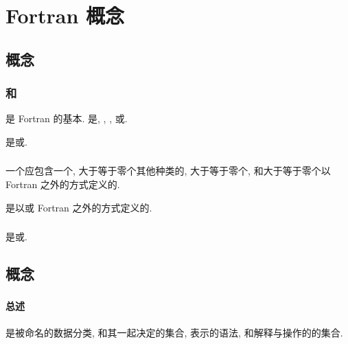 \chapter{Fortran 概念}

\section{\ProgramUnit{}概念}

\subsection{\ProgramUnit{}和\ScopingUnit{}}

\ProgramUnit{}是 Fortran \Program{}的基本\Component{}. \ProgramUnit{}是\MainProgram{}, \ExternalSubprogram{}, \Module{}, 或\Submodule{}.

\Subprogram{}是\Function{}\Subprogram{}或\Subroutine{}\Subprogram{}.

\subsection{\Program{}}

一个\Program{}应包含一个\MainProgram{}, 大于等于零个其他种类的\ProgramUnit{}, 大于等于零个\ExternalProcedure{}, 和大于等于零个以 Fortran 之外的方式定义的\Entity{}.

\ExternalProcedure{}是以\ExternalSubprogram{}或 Fortran 之外的方式定义的\Procedure{}.

\subsection{\Procedure{}}

\Procedure{}是\Function{}或\Subroutine{}.

\section{\Datum{}概念}

\subsection{\Type{}}

\subsubsection{总述}

\Type{}是被命名的数据分类, 和其\TypeParameter{}一起决定\Value{}的集合, 表示\Value{}的语法, 和解释与操作\Value{}的\Operation{}的集合.

